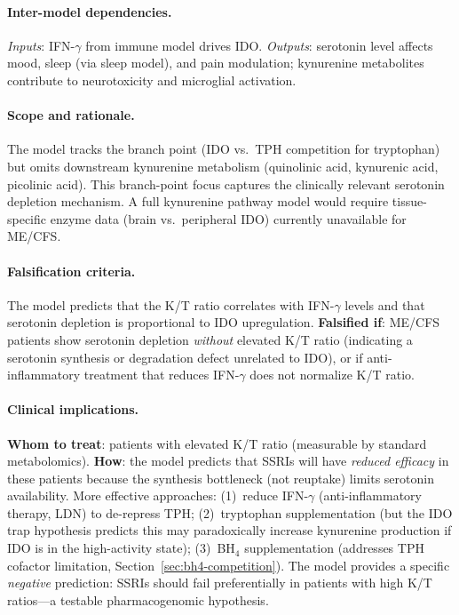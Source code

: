 \paragraph{Inter-model dependencies.}
\emph{Inputs}: IFN-$\gamma$ from immune model drives IDO. \emph{Outputs}: serotonin level affects mood, sleep (via sleep model), and pain modulation; kynurenine metabolites contribute to neurotoxicity and microglial activation.

\paragraph{Scope and rationale.}
The model tracks the branch point (IDO vs.\ TPH competition for tryptophan) but omits downstream kynurenine metabolism (quinolinic acid, kynurenic acid, picolinic acid). This branch-point focus captures the clinically relevant serotonin depletion mechanism. A full kynurenine pathway model would require tissue-specific enzyme data (brain vs.\ peripheral IDO) currently unavailable for ME/CFS.

\paragraph{Falsification criteria.}
The model predicts that the K/T ratio correlates with IFN-$\gamma$ levels and that serotonin depletion is proportional to IDO upregulation. \textbf{Falsified if}: ME/CFS patients show serotonin depletion \emph{without} elevated K/T ratio (indicating a serotonin synthesis or degradation defect unrelated to IDO), or if anti-inflammatory treatment that reduces IFN-$\gamma$ does not normalize K/T ratio.

\paragraph{Clinical implications.}
\textbf{Whom to treat}: patients with elevated K/T ratio (measurable by standard metabolomics). \textbf{How}: the model predicts that SSRIs will have \emph{reduced efficacy} in these patients because the synthesis bottleneck (not reuptake) limits serotonin availability. More effective approaches: (1)~reduce IFN-$\gamma$ (anti-inflammatory therapy, LDN) to de-repress TPH; (2)~tryptophan supplementation (but the IDO trap hypothesis predicts this may paradoxically increase kynurenine production if IDO is in the high-activity state); (3)~BH$_4$ supplementation (addresses TPH cofactor limitation, Section~\ref{sec:bh4-competition}). The model provides a specific \emph{negative} prediction: SSRIs should fail preferentially in patients with high K/T ratios---a testable pharmacogenomic hypothesis.


